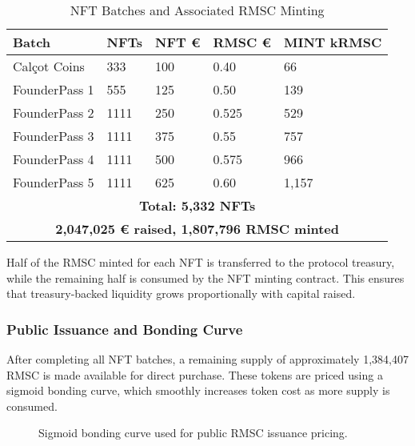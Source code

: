 \documentclass[conference]{IEEEtran}
\begin{document}
\begin{table}[ht]
\caption{NFT Batches and Associated RMSC Minting}
\centering
\scriptsize
\begin{tabular}{|p{1.5cm}|p{0.6cm}|p{0.7cm}|p{0.7cm}|p{0.7cm}|}
\hline
\textbf{Batch} & \textbf{NFTs} & \textbf{NFT €} & \textbf{RMSC €} & \textbf{MINT kRMSC} \\
\hline
Calçot Coins     & 333  & 100  & 0.40  & 66  \\
FounderPass 1    & 555  & 125  & 0.50  & 139  \\
FounderPass 2    & 1111 & 250  & 0.525 & 529  \\
FounderPass 3    & 1111 & 375  & 0.55  & 757  \\
FounderPass 4    & 1111 & 500  & 0.575 & 966  \\
FounderPass 5    & 1111 & 625  & 0.60  & 1,157  \\
\hline
\multicolumn{5}{|c|}{\textbf{Total: 5,332 NFTs}} \\
\multicolumn{5}{|c|}{\textbf{2,047,025 € raised, 1,807,796 RMSC minted}} \\
\hline
\end{tabular}
\end{table}






Half of the RMSC minted for each NFT is transferred to the protocol treasury, while the remaining half is consumed by the NFT minting contract. This ensures that treasury-backed liquidity grows proportionally with capital raised.

\subsubsection{Public Issuance and Bonding Curve}

After completing all NFT batches, a remaining supply of approximately 1,384,407 RMSC is made available for direct purchase. These tokens are priced using a sigmoid bonding curve, which smoothly increases token cost as more supply is consumed.
\begin{figure}[ht]
\centering
{}
\caption{Sigmoid bonding curve used for public RMSC issuance pricing.}
\label{fig:sigmoidcurve}
\end{figure}
\end{document}
